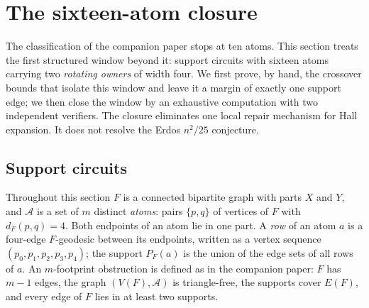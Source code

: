 %
%

\section{The sixteen-atom closure}\label{sec:t4}

The classification of the companion paper \cite{Ferudun26supports} stops at ten atoms.
This section treats the first structured window beyond it: support
circuits with sixteen atoms carrying two \emph{rotating owners} of width
four. We first prove, by hand, the crossover bounds that isolate this
window and leave it a margin of exactly one support edge; we then close
the window by an exhaustive computation with two independent verifiers.
The closure eliminates one local repair mechanism for Hall expansion.
It does not resolve the Erdos \(n^2/25\) conjecture.

\subsection{Support circuits}\label{subsec:t4:circuits}

Throughout this section \(F\) is a connected bipartite graph with parts
\(X\) and \(Y\), and \(\mathcal A\) is a set of \(m\) distinct
\emph{atoms}: pairs \(\{p,q\}\) of vertices of \(F\) with
\(d_F(p,q)=4\). Both endpoints of an atom lie in one part. A \emph{row}
of an atom \(a\) is a four-edge \(F\)-geodesic between its endpoints,
written as a vertex sequence \((p_0,p_1,p_2,p_3,p_4)\); the support
\(P_F(a)\) is the union of the edge sets of all rows of \(a\). An
\(m\)-footprint obstruction is defined as in the companion paper: \(F\)
has \(m-1\) edges, the graph \((V(F),\mathcal A)\) is triangle-free, the
supports cover \(E(F)\), and every edge of \(F\) lies in at least two
supports.

